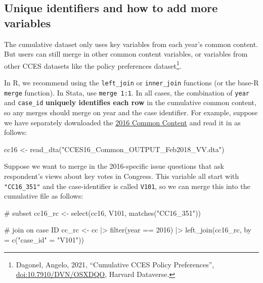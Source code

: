 \documentclass[10pt,article,oneside]{memoir}
\theoremstyle{definition}
\newenvironment{Shaded}{\begin{snugshade}}{\end{snugshade}}
\newcommand{\AttributeTok}[1]{\textcolor[rgb]{0.40,0.45,0.13}{#1}}
\newcommand{\CommentTok}[1]{\textcolor[rgb]{0.37,0.37,0.37}{#1}}
\newcommand{\DecValTok}[1]{\textcolor[rgb]{0.68,0.00,0.00}{#1}}
\newcommand{\FunctionTok}[1]{\textcolor[rgb]{0.28,0.35,0.67}{#1}}
\newcommand{\NormalTok}[1]{\textcolor[rgb]{0.00,0.23,0.31}{#1}}
\newcommand{\OtherTok}[1]{\textcolor[rgb]{0.00,0.23,0.31}{#1}}
\newcommand{\SpecialCharTok}[1]{\textcolor[rgb]{0.37,0.37,0.37}{#1}}
\newcommand{\StringTok}[1]{\textcolor[rgb]{0.13,0.47,0.30}{#1}}
\begin{document}
\subsection{Unique identifiers and how to add more
variables}\label{unique-identifiers-and-how-to-add-more-variables}

The cumulative dataset only uses key variables from each year's common
content. But users can still merge in other common content variables, or
variables from other CCES datasets like the policy preferences
dataset\footnote{Dagonel, Angelo, 2021, ``Cumulative CCES Policy Preferences'', \href{https://dataverse.harvard.edu/dataset.xhtml?persistentId=doi:10.7910/DVN/OSXDQO}{\url{doi:10.7910/DVN/OSXDQO}}, Harvard Dataverse.}.

In R, we recommend using the \texttt{left\_join} or \texttt{inner\_join}
functions (or the base-R \texttt{merge} function). In Stata, use
\texttt{merge\ 1:1}. In all cases, the combination of \texttt{year} and
\texttt{case\_id} \textbf{uniquely identifies each row} in the
cumulative common content, so any merges should merge on year and the
case identifier. For example, suppose we have separately downloaded the
\href{https://doi.org/10.7910/DVN/GDF6Z0/JPMOZZ}{2016 Common Content}
and read it in as follows:

\begin{Shaded}
\begin{Highlighting}[]
\NormalTok{cc16 }\OtherTok{\textless{}{-}} \FunctionTok{read\_dta}\NormalTok{(}\StringTok{"CCES16\_Common\_OUTPUT\_Feb2018\_VV.dta"}\NormalTok{)}
\end{Highlighting}
\end{Shaded}

Suppose we want to merge in the 2016-specific issue questions that ask
respondent's views about key votes in Congress. This variable all start
with \texttt{"CC16\_351"} and the case-identifier is called
\texttt{V101}, so we can merge this into the cumulative file as follows:

\begin{Shaded}
\begin{Highlighting}[]
\CommentTok{\# subset}
\NormalTok{cc16\_rc }\OtherTok{\textless{}{-}} \FunctionTok{select}\NormalTok{(cc16, V101, }\FunctionTok{matches}\NormalTok{(}\StringTok{"CC16\_351"}\NormalTok{))}

\CommentTok{\# join on case ID}
\NormalTok{cc\_rc }\OtherTok{\textless{}{-}}\NormalTok{ cc }\SpecialCharTok{|\textgreater{}} 
  \FunctionTok{filter}\NormalTok{(year }\SpecialCharTok{==} \DecValTok{2016}\NormalTok{) }\SpecialCharTok{|\textgreater{}} 
  \FunctionTok{left\_join}\NormalTok{(cc16\_rc, }\AttributeTok{by =} \FunctionTok{c}\NormalTok{(}\StringTok{"case\_id"} \OtherTok{=} \StringTok{"V101"}\NormalTok{))}
\end{Highlighting}
\end{Shaded}
\end{document}
